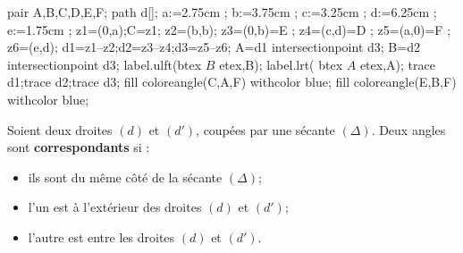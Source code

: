 \begin{changemargin}{0mm}{-25mm}
   \begin{definition}
      \begin{minipage}{0.3\linewidth}
         \begin{center}
            \begin{Geometrie}[CoinHD={(4u,7u)}]
               pair A,B,C,D,E,F;
               path d[];
               a:=2.75cm ;
               b:=3.75cm ;
               c:=3.25cm ;
               d:=6.25cm ;
               e:=1.75cm ;
               z1=(0,a);C=z1;
               z2=(b,b);
               z3=(0,b)=E ;
               z4=(c,d)=D ;
               z5=(a,0)=F ;
               z6=(e,d);
               d1=z1--z2;d2=z3--z4;d3=z5--z6;
               A=d1 intersectionpoint d3;
               B=d2 intersectionpoint d3;
               label.ulft(btex $B$ etex,B);
               label.lrt( btex $A$ etex,A);
               trace d1;trace d2;trace d3;
               fill coloreangle(C,A,F) withcolor blue;
               fill coloreangle(E,B,F) withcolor blue;
            \end{Geometrie}
         \end{center}
      \end{minipage}
      \hfill
      \begin{minipage}{0.6\linewidth}
         Soient deux droites $(d)$ et $(d')$, coupées par une sécante $(\Delta)$.
         Deux angles sont \textbf{\red correspondants} si :
         \begin{itemize}
            \item  ils sont du même côté de la sécante $(\Delta)$;
            \item  l'un est à l'extérieur des droites $(d)$ et $(d')$;
            \item  l'autre est entre les droites $(d)$ et $(d')$.
         \end{itemize}
      \end{minipage}
   \end{definition}


\end{changemargin}
